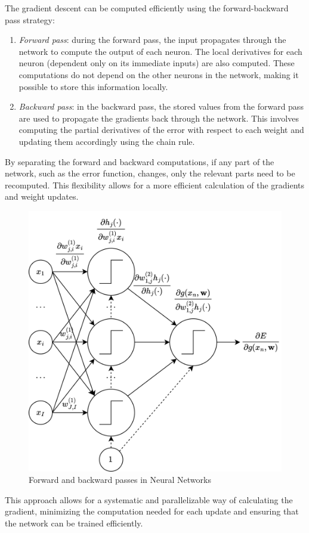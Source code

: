 The gradient descent can be computed efficiently using the forward-backward pass strategy:
\begin{enumerate}
    \item \textit{Forward pass}: during the forward pass, the input propagates through the network to compute the output of each neuron. 
        The local derivatives for each neuron (dependent only on its immediate inputs) are also computed. 
        These computations do not depend on the other neurons in the network, making it possible to store this information locally.
    \item \textit{Backward pass}: in the backward pass, the stored values from the forward pass are used to propagate the gradients back through the network.
        This involves computing the partial derivatives of the error with respect to each weight and updating them accordingly using the chain rule.
\end{enumerate}
By separating the forward and backward computations, if any part of the network, such as the error function, changes, only the relevant parts need to be recomputed. 
This flexibility allows for a more efficient calculation of the gradients and weight updates.
\begin{figure}[H]
    \centering
    \includegraphics[width=0.75\linewidth]{images/bacfor.png}
    \caption{Forward and backward passes in Neural Networks}
\end{figure}
This approach allows for a systematic and parallelizable way of calculating the gradient, minimizing the computation needed for each update and ensuring that the network can be trained efficiently.

